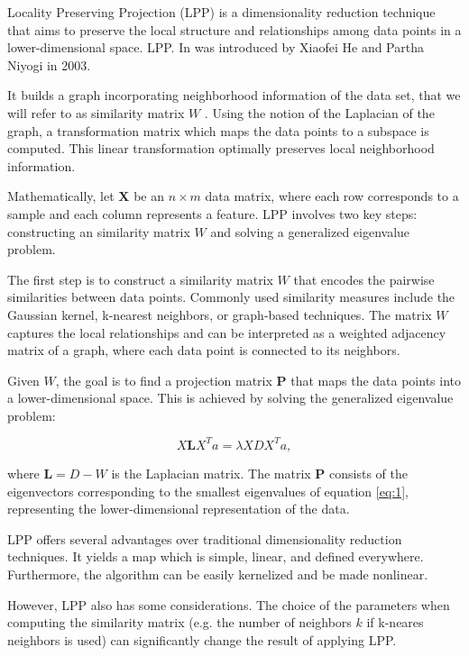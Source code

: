 Locality Preserving Projection (LPP) is a dimensionality reduction technique that aims to preserve the local structure and relationships among data points in a lower-dimensional space. LPP. In was introduced by Xiaofei He and Partha Niyogi in 2003.

It builds a graph incorporating neighborhood information
of the data set, that we will refer to as similarity matrix $W$ . Using the notion of the Laplacian of the graph, a transformation matrix which maps the data points to a subspace is computed. This linear transformation optimally preserves local neighborhood information.

Mathematically, let $\mathbf{X}$ be an $n \times m$ data matrix, where each row corresponds to a sample and each column represents a feature. LPP involves two key steps: constructing an similarity matrix $W$ and solving a generalized eigenvalue problem.

The first step is to construct a similarity matrix $W$ that encodes the pairwise similarities between data points. Commonly used similarity measures include the Gaussian kernel, k-nearest neighbors, or graph-based techniques. The matrix $W$ captures the local relationships and can be interpreted as a weighted adjacency matrix of a graph, where each data point is connected to its neighbors.

Given $W$, the goal is to find a projection matrix $\mathbf{P}$ that maps the data points into a lower-dimensional space. This is achieved by solving the generalized eigenvalue problem:

\begin{equation} \label{eq:1}
    X \mathbf{L} X^T a = \lambda XDX^Ta,
\end{equation}

where $\mathbf{L} = D-W$ is the Laplacian matrix. The matrix $\mathbf{P}$ consists of the eigenvectors corresponding to the smallest eigenvalues of equation \ref{eq:1}, representing the lower-dimensional representation of the data.

LPP offers several advantages over traditional dimensionality reduction techniques. It yields a map which is simple, linear, and defined everywhere. Furthermore, the algorithm can be easily kernelized and be made nonlinear.

However, LPP also has some considerations. The choice of the parameters when computing the similarity matrix (e.g. the number of neighbors $k$ if k-neares neighbors is used) can significantly change the result of applying LPP.

